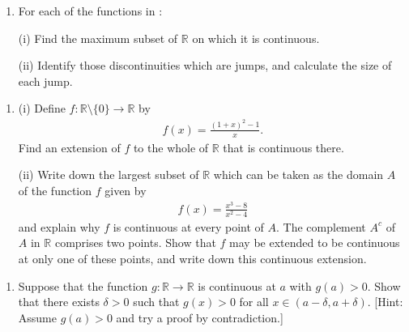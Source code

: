 \documentclass[letterpaper,10pt,english]{jupyterBook}
\begin{document}
\label{\detokenize{Problems:id17}}\begin{enumerate}
%
\setcounter{enumi}{16}
\item {} 
\sphinxAtStartPar
For each of the functions in {\hyperref[\detokenize{Problems:id7}]{}}:

\sphinxAtStartPar
(i) Find the maximum subset of \(\mathbb{R}\) on which it is continuous.

\sphinxAtStartPar
(ii) Identify those discontinuities which are jumps, and calculate the size of each jump.

\end{enumerate}
\label{\detokenize{Problems:id18}}\begin{enumerate}
%
\setcounter{enumi}{17}
\item {} 
\sphinxAtStartPar
(i) Define \(f:\mathbb{R} \setminus \{0\} \rightarrow \mathbb{R}\) by
\begin{equation*}
\begin{split}
    f(x) = \displaystyle\frac{(1 + x)^{2} - 1}{x}.
    \end{split}
\end{equation*}
\sphinxAtStartPar
Find an extension of \(f\) to the whole of \(\mathbb{R}\) that is continuous there.

\sphinxAtStartPar
(ii) Write down the largest subset of \(\mathbb{R}\) which can be taken as the domain \(A\) of the function \(f\) given by
\begin{equation*}
\begin{split}
    f(x) = \displaystyle\frac{x^{3}-8}{x^{2} - 4}
    \end{split}
\end{equation*}
\sphinxAtStartPar
and explain why \(f\) is continuous at every point of \(A\). The complement \(A^{c}\) of \(A\) in \(\mathbb{R}\) comprises two points. Show that \(f\) may be extended to be continuous at only one of these points, and write down this continuous extension.

\end{enumerate}
\label{\detokenize{Problems:id19}}\begin{enumerate}
%
\setcounter{enumi}{18}
\item {} 
\sphinxAtStartPar
Suppose that the function \(g: \mathbb{R} \rightarrow \mathbb{R}\) is continuous at \(a\) with \(g(a) > 0\). Show that there exists \(\delta > 0\) such that \(g(x) > 0\)  for all \( x \in (a - \delta, a + \delta)\). {[}Hint: Assume \(g(a) > 0\) and try a proof by contradiction.{]}

\end{enumerate}
\end{document}
